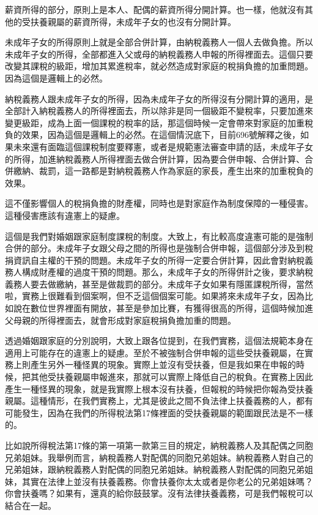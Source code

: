 \documentclass[]{ctexbook}
\begin{document}
薪資所得的部分，原則上是本人、配偶的薪資所得分開計算。也一樣，他就沒有其他的受扶養親屬的薪資所得，未成年子女的也沒有分開計算。

未成年子女的所得原則上就是全部合併計算，由納稅義務人一個人去做負擔。所以未成年子女的所得，全部都進入父或母的納稅義務人申報的所得裡面去。這個只要改變其課稅的級距，增加其累進稅率，就必然造成對家庭的稅捐負擔的加重問題。因為這個是邏輯上的必然。

納稅義務人跟未成年子女的所得，因為未成年子女的所得沒有分開計算的適用，是全部計入納稅義務人的所得裡面去，所以除非是同一個級距不變稅率，只要加進來變更級距，成為上面一個課稅的稅率的話，那這個時候一定會帶來對家庭的加重稅負的效果，因為這個是邏輯上的必然。在這個情況底下，目前696號解釋之後，如果未來還有面臨這個課稅制度要釋憲，或者是規範憲法審查申請的話，未成年子女的所得，加進納稅義務人所得裡面去做合併計算，因為要合併申報、合併計算、合併繳納、裁罰，這一路都是對納稅義務人作為家庭的家長，產生出來的加重稅負的效果。

這不僅影響個人的稅捐負擔的財產權，同時也是對家庭作為制度保障的一種侵害。這種侵害應該有違憲上的疑慮。

這個是我們對婚姻跟家庭制度課稅的制度。大致上，有比較高度違憲可能的是強制合併的部分。未成年子女跟父母之間的所得也是強制合併申報，這個部分涉及到稅捐資訊自主權的干預的問題。未成年子女的所得一定要合併計算，因此會對納稅義務人構成財產權的過度干預的問題。那么，未成年子女的所得併計之後，要求納稅義務人要去做繳納，甚至是做裁罰的部分。未成年子女如果有隱匿課稅所得，當然啦，實務上很難看到個案啊，但不乏這個個案可能。如果將來未成年子女，因為比如說在數位世界裡面有開放，甚至是參加比賽，有獲得很高的所得，這個時候加進父母親的所得裡面去，就會形成對家庭稅捐負擔加重的問題。

透過婚姻跟家庭的分別說明，大致上跟各位提到，在我們實務，這個法規範本身在適用上可能存在的違憲上的疑慮。至於不被強制合併申報的這些受扶養親屬，在實務上則產生另外一種怪異的現象。實際上並沒有受扶養，但是我如果在申報的時候，把其他受扶養親屬申報進來，那就可以實際上降低自己的稅負。在實務上因此產生一種怪異的現象，就是我實際上根本沒有扶養，但報稅的時候把你報為受扶養親屬。這種情形，在我們實務上，尤其是彼此之間不負法律上扶養義務的人，都有可能發生，因為在我們的所得稅法第17條裡面的受扶養親屬的範圍跟民法是不一樣的。

比如說所得稅法第17條的第一項第一款第三目的規定，納稅義務人及其配偶之同胞兄弟姐妹。我舉例而言，納稅義務人對配偶的同胞兄弟姐妹。納稅義務人對自己的兄弟姐妹，跟納稅義務人對配偶的同胞兄弟姐妹。納稅義務人對配偶的同胞兄弟姐妹，其實在法律上並沒有扶養義務。你會扶養你太太或者是你老公的兄弟姐妹嗎？你會扶養嗎？如果有，還真的給你鼓鼓掌。沒有法律扶養義務，可是我們報稅可以結合在一起。
\end{document}
